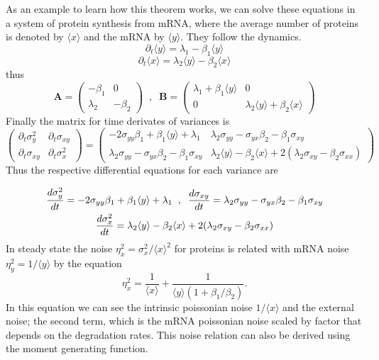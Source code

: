 As an example to learn how  this theorem works, we can solve these equations in a system of protein synthesis from mRNA, where the average number of proteins is denoted by $\langle x\rangle$ and the mRNA by $\langle y\rangle$. They follow the dynamics.
\begin{equation}
\partial_{t}\langle y\rangle=\lambda_{1}- \beta_{1}\langle y\rangle
\end{equation}  
\begin{equation}
\partial_{t}\langle x \rangle=\lambda_{2}\langle y\rangle - \beta_{2}\langle x\rangle
\end{equation}
thus
\begin{equation}
\mathbf{A}=
\begin{pmatrix}
-\beta_1 & 0 \\
\lambda_2 & -\beta_2
\end{pmatrix}\;\; , \;\; \mathbf{B}=\begin{pmatrix} \lambda_1 + \beta_1 \langle y\rangle & 0 \\
0 & \lambda_2\langle y\rangle+ \beta_2\langle x\rangle\end{pmatrix}
\end{equation}
Finally the matrix for time derivates of variances is
\begin{equation}
\begin{pmatrix} \partial_{t} \sigma_{y}^{2} & \partial_t \sigma_{xy}\\
\partial_t \sigma_{xy} & \partial_t \sigma_{x}^{2}
\end{pmatrix}
=
\begin{pmatrix} -2\sigma_{yy}\beta_{1}+\beta_1\langle y\rangle+\lambda_1 & \lambda_2\sigma_{yy}-\sigma_{yx}\beta_2-\beta_1\sigma_{xy}\\
\lambda_2\sigma_{yy}-\sigma_{yx}\beta_2-\beta_1\sigma_{xy} & \lambda_2\langle y\rangle-\beta_2 \langle x\rangle + 2(\lambda_2\sigma_{xy}-\beta_2\sigma_{xx})
\end{pmatrix}
\end{equation}
Thus the respective differential equations for each variance are

\begin{gather}
\frac{d \sigma_{y}^{2}}{dt}=-2\sigma_{yy}\beta_1 + \beta_1 \langle y\rangle + \lambda_1\;\;, \;\; \frac{d\sigma_{xy}}{dt}= \lambda_2\sigma_{yy}-\sigma_{yx}\beta_2-\beta_1\sigma_{xy} \notag \\
\frac{d\sigma_{x}^{2}}{dt}=\lambda_2\langle y\rangle-\beta_2 \langle x\rangle + 2(\lambda_2\sigma_{xy}-\beta_2\sigma_{xx})
\end{gather}
In steady state the noise $\eta_{x}^{2}=\sigma_{x}^{2}/\langle x\rangle^2$ for proteins is related with mRNA noise $\eta_{y}^{2}=1/\langle y\rangle$ by the equation
\begin{equation}
\eta_{x}^{2}=\frac{1}{\langle x\rangle} +\frac{1}{\langle y\rangle(1+\beta_1/\beta_2)}.
\end{equation} 
In this equation we can see the intrinsic poissonian noise $1/\langle x\rangle$ and the external noise; the second term, which is the mRNA poissonian noise scaled by factor that depends on the degradation rates. This noise relation can also be  derived using the moment generating function\cite{Pedraza1}.
